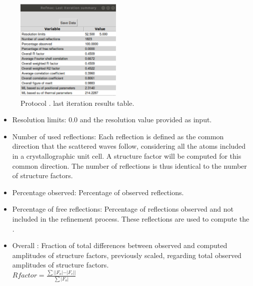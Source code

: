 \begin{itemize}
\begin{itemize}
\begin{figure}[H]
         \centering 
         \captionsetup{width=.9\linewidth} 
         \includegraphics[width=0.45\textwidth]{Images_appendix/Fig132.pdf}
         \caption{Protocol .  last iteration results table.}
         \label{fig:app_protocol_refmac_7}
        \end{figure}
     
     \begin{itemize}
     \item Resolution limits: 0.0 and the resolution value provided as input.
     
     \item Number of used reflections: Each reflection is defined as the common direction that the scattered waves follow, considering all the atoms included in a crystallographic unit cell. A structure factor will be computed for this common direction. The number of reflections is thus identical to the number of structure factors.
     
     \item Percentage observed: Percentage of observed reflections.
     
     \item Percentage of free reflections: Percentage of reflections observed and not included in the refinement process. These reflections are used to compute the .
     
     \item Overall : Fraction of total differences between observed and computed amplitudes of structure factors, previously scaled, regarding total observed amplitudes of structure factors.\\
     
     \begin{math}
     R factor = \frac{\sum||F_o|-|F_c||}{\sum|F_o|} 
     \end{math}\\
     

\end{itemize}
\end{itemize}
\end{itemize}
